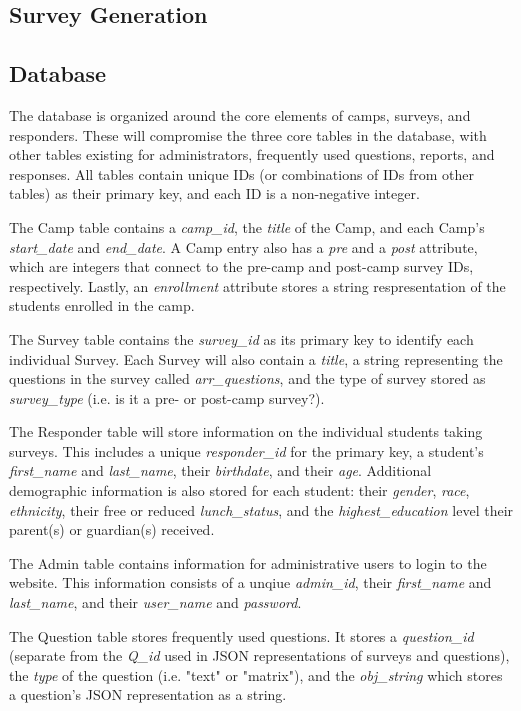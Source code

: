 \documentclass[letterpaper,10pt,serif,draftclsnofoot,onecolumn,compsoc,titlepage]{IEEEtran}
\begin{document}
\subsection{Survey Generation}

\subsection{Database}
The database is organized around the core elements of camps, surveys, and responders.
These will compromise the three core tables in the database, with other tables existing for administrators, frequently used questions, reports, and responses.
All tables contain unique IDs (or combinations of IDs from other tables) as their primary key, and each ID is a non-negative integer.

The Camp table contains a \emph{camp\_id}, the \emph{title} of the Camp, and each Camp's \emph{start\_date} and \emph{end\_date}.
A Camp entry also has a \emph{pre} and a \emph{post} attribute, which are integers that connect to the pre-camp and post-camp survey IDs, respectively.
Lastly, an \emph{enrollment} attribute stores a string respresentation of the students enrolled in the camp.

The Survey table contains the \emph{survey\_id} as its primary key to identify each individual Survey.
Each Survey will also contain a \emph{title}, a string representing the questions in the survey called \emph{arr\_questions}, and the type of survey stored as \emph{survey\_type} (i.e. is it a pre- or post-camp survey?).

The Responder table will store information on the individual students taking surveys.
This includes a unique \emph{responder\_id} for the primary key, a student's \emph{first\_name} and \emph{last\_name}, their \emph{birthdate}, and their \emph{age}.
Additional demographic information is also stored for each student: their \emph{gender}, \emph{race}, \emph{ethnicity}, their free or reduced \emph{lunch\_status}, and the \emph{highest\_education} level their parent(s) or guardian(s) received.

The Admin table contains information for administrative users to login to the website.
This information consists of a unqiue \emph{admin\_id}, their \emph{first\_name} and \emph{last\_name}, and their \emph{user\_name} and \emph{password}.

The Question table stores frequently used questions.
It stores a \emph{question\_id} (separate from the \emph{Q\_id} used in JSON representations of surveys and questions), the \emph{type} of the question (i.e. "text" or "matrix"), and the \emph{obj\_string} which stores a question's JSON representation as a string.
\end{document}
